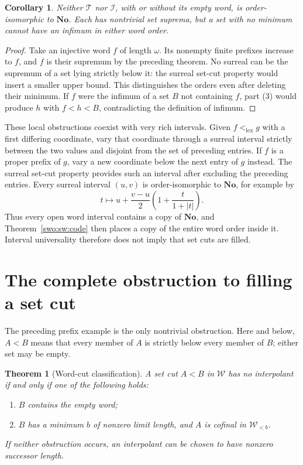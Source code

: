 \documentclass[11pt]{article}
\newtheorem{theorem}{Theorem}[section]
\newtheorem{corollary}[corollary]{Corollary}
\theoremstyle{definition}
\theoremstyle{remark}
\newcommand{\No}{\mathbf{No}}
\newcommand{\Words}{\mathcal I}
\newcommand{\WordsAll}{\mathcal T}
\newcommand{\lex}{\mathrm{lex}}
\begin{document}
\begin{corollary}\label{swo:sw:notiso}
Neither \(\WordsAll\) nor \(\Words\), with or without its
empty word, is order-isomorphic to \(\No\).
Each has nontrivial set suprema, but a set with no minimum
cannot have an infimum in either word order.
\end{corollary}

\begin{proof}
Take an injective word \(f\) of length \(\omega\).
Its nonempty finite prefixes increase to \(f\), and \(f\)
is their supremum by the preceding theorem.
No surreal can be the supremum of a set lying strictly
below it: the surreal set-cut property would insert a
smaller upper bound.  This distinguishes the orders even
after deleting their minimum.
If \(f\) were the infimum of a set \(B\) not containing \(f\),
part (3) would produce \(h\) with \(f<h<B\), contradicting
the definition of infimum.
\end{proof}

These local obstructions coexist with very rich intervals.
Given \(f<_{\lex}g\) with a first differing coordinate, vary
that coordinate through a surreal interval strictly between
the two values and disjoint from the set of preceding entries.
If \(f\) is a proper prefix of \(g\), vary a new coordinate
below the next entry of \(g\) instead.
The surreal set-cut property provides such an interval after
excluding the preceding entries.
Every surreal interval \((u,v)\) is order-isomorphic to
\(\No\), for example by
\[
 t\longmapsto u+\frac{v-u}{2}
                      \left(1+\frac{t}{1+|t|}\right).
\]
Thus every open word interval contains a copy of \(\No\),
and Theorem~\ref{swo:sw:code} then places a copy of the entire
word order inside it.
Interval universality therefore does not imply that set cuts
are filled.

\section{The complete obstruction to filling a set cut}
\label{swo:sw:wordcuts}

The preceding prefix example is the only nontrivial obstruction.
Here and below, \(A<B\) means that every member of \(A\) is
strictly below every member of \(B\); either set may be empty.

\begin{theorem}[Word-cut classification]\label{swo:sw:cutclassification}
A set cut \(A<B\) in \(\mathcal W\) has no interpolant
if and only if one of the following holds:
\begin{enumerate}
\item \(B\) contains the empty word;
\item \(B\) has a minimum \(b\) of nonzero limit length,
      and \(A\) is cofinal in \(\mathcal W_{<b}\).
\end{enumerate}
If neither obstruction occurs, an interpolant can be chosen
to have nonzero successor length.
\end{theorem}
\end{document}
